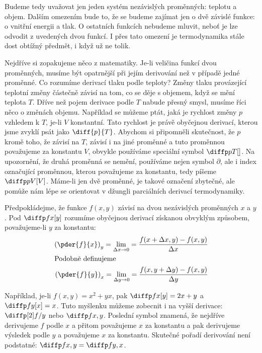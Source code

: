     Budeme tedy uvažovat jen jeden systém nezávislých proměnných: teplotu a objem. Dalším
    omezením bude to, že se budeme zajímat jen o dvě závislé funkce: o vnitřní energii a tlak. O
    ostatních funkcích nebudeme mluvit, neboť je lze odvodit z uvedených dvou funkcí. I přes tato
    omezení je termodynamika stále dost obtížný předmět, i když už ne tolik.

    Nejdříve si zopakujeme něco z matematiky. Je-li veličina funkcí dvou proměnných, musíme být
    opatrnější při jejím derivování než v případě jedné proměnné. Co rozumíme derivací tlaku podle
    teploty? Změny tlaku provázející teplotní změny částečně závisí na tom, co se děje s objemem,
    když se mění teplota \(T\). Dříve než pojem derivace podle \(T\) nabude přesný smysl, musíme
    říci něco o změnách objemu. Například se můžeme ptát, jaká je rychlost změny \(p\) vzhledem k
    \(T\), je-li \(V\) konstantní. Tato rychlost je právě obyčejnou derivací, kterou jsme zvyklí
    psát jako \(\diff{p}{T}\). Abychom si připomněli skutečnost, že \(p\) kromě toho, že závisí na
    \(T\), závisí i na jiné proměnné a tuto proměnnou považujeme za konstantu \(V\), obvykle
    používáme speciální symbol \(\diffp pT[]\). Na upozornění, že druhá proměnná se nemění,
    používáme nejen symbol \(\partial\), ale i index označující proměnnou, kterou považujeme za
    konstantu, tedy píšeme \(\diffp pV[V]\). Máme-li jen dvě proměnné, je takové
    označení zbytečné, ale pomůže nám lépe se orientovat v džungli parciálních derivací
    termodynamiky.

    Předpokládejme, že funkce \(f(x, y)\) závisí na dvou nezávislých proměnných \(x\) a \(y\). Pod
    \(\diffp fx[y]\) rozumíme obyčejnou derivací získanou obvyklým způsobem, považujeme-li \(y\) za
    konstantu:
    \begin{align*}
      \left(\pder{f}{x}\right)_y = \lim_{\Delta x \rightarrow0} 
                                 = \dfrac{f(x+\Delta x,y) - f(x,y)}{\Delta x}   \\
      \shortintertext{Podobně definujeme}
      \left(\pder{f}{y}\right)_x = \lim_{\Delta y \rightarrow0} 
                                 = \dfrac{f(x,y +\Delta y) - f(x,y)}{\Delta y}  
    \end{align*}

    Například, je-li \(f(x, y) =x^2 + yx\), pak \(\diffp fx[y] = 2x + y\) a \(\diffp fy[x] = x\).
    Tuto myšlenku můžeme zobecnit i na vyšší derivace: \(\diffp[2]f/y\) nebo \(\diffp f{x,y}\).
    Poslední symbol znamená, že nejdříve derivujeme \(f\) podle \(x\) a přitom považujeme \(x\) za
    konstantu a pak derivujeme výsledek podle \(y\) a považujeme \(x\) za konstantu. Skutečné pořadí
    derivování není podstatné: \(\diffp f{x,y} = \diffp f{y,x}\).



